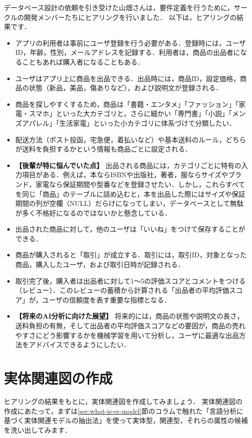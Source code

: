 データベース設計の依頼を引き受けた山畑さんは，要件定義を行うために，サークルの開発メンバーたちにヒアリングを行いました．
以下は，ヒアリングの結果です．
\begin{itemize}
\item アプリの利用者は事前にユーザ登録を行う必要がある．登録時には，ユーザID，年齢，性別，メールアドレスを記録する．利用者は，商品の出品者になることもあれば購入者になることもある．
\item ユーザはアプリ上に商品を出品できる．出品時には，商品ID，設定価格，商品の状態（新品，美品，傷ありなど），および説明文が登録される．
\item 商品を探しやすくするため，商品は「書籍・エンタメ」「ファッション」「家電・スマホ」といった大カテゴリと，さらに細かい「専門書」「小説」「メンズアパレル」「生活家電」といった小カテゴリに体系づけて分類したい．
\item 配送方法（ポスト投函，宅急便，着払いなど）や基本送料のルール，どちらが送料を負担するかという情報も商品ごとに設定される．
\item \textbf{【後輩が特に悩んでいた点】} 出品される商品には，カテゴリごとに特有の入力項目がある．例えば，本ならISBNや出版社，著者，服ならサイズやブランド，家電なら保証期間や型番などを登録させたい．しかし，これらすべてを同じ「商品」のテーブルに詰め込むと，本を出品した際にはサイズや保証期間の列が空欄（NULL）だらけになってしまい，データベースとして無駄が多く不格好になるのではないかと懸念している．
\item 出品された商品に対して，他のユーザは「いいね」をつけて保存することができる．
\item 商品が購入されると「取引」が成立する．取引には，取引ID，対象となった商品，購入したユーザ，および取引日時が記録される．
\item 取引完了後，購入者は出品者に対して1〜5の評価スコアとコメントをつける（レビュー）．このレビューの蓄積から計算される「出品者の平均評価スコア」が，ユーザの信頼度を表す重要な指標となる．
\item \textbf{【将来のAI分析に向けた展望】} 将来的には，商品の状態や説明文の長さ，送料負担の有無，そして出品者の平均評価スコアなどの要因が，商品の売れやすさにどう影響するかを機械学習を用いて分析し，ユーザに最適な出品方法をアドバイスできるようにしたい．
\end{itemize}


\section{実体関連図の作成}
ヒアリングの結果をもとに，実体関連図を作成してみましょう．
実体関連図の作成にあたって，まずは\ref{sec:what-is-er-model}節のコラムで触れた「言語分析に基づく実体関連モデルの抽出法」を使って実体型，関連型，それらの属性の候補を洗い出してみます．

